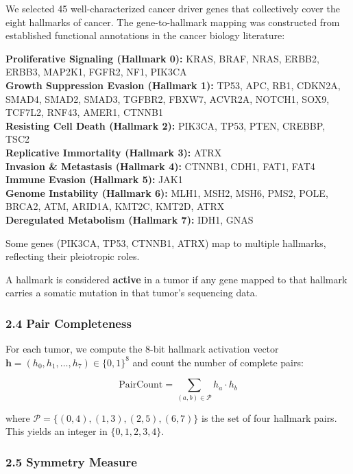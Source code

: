 \documentclass[
  11pt,
]{article}
\begin{document}
We selected 45 well-characterized cancer driver genes that collectively
cover the eight hallmarks of cancer. The gene-to-hallmark mapping was
constructed from established functional annotations in the cancer
biology literature:

\textbf{Proliferative Signaling (Hallmark 0):} KRAS, BRAF, NRAS, ERBB2,
ERBB3, MAP2K1, FGFR2, NF1, PIK3CA\\
\textbf{Growth Suppression Evasion (Hallmark 1):} TP53, APC, RB1,
CDKN2A, SMAD4, SMAD2, SMAD3, TGFBR2, FBXW7, ACVR2A, NOTCH1, SOX9,
TCF7L2, RNF43, AMER1, CTNNB1\\
\textbf{Resisting Cell Death (Hallmark 2):} PIK3CA, TP53, PTEN, CREBBP,
TSC2\\
\textbf{Replicative Immortality (Hallmark 3):} ATRX\\
\textbf{Invasion \& Metastasis (Hallmark 4):} CTNNB1, CDH1, FAT1, FAT4\\
\textbf{Immune Evasion (Hallmark 5):} JAK1\\
\textbf{Genome Instability (Hallmark 6):} MLH1, MSH2, MSH6, PMS2, POLE,
BRCA2, ATM, ARID1A, KMT2C, KMT2D, ATRX\\
\textbf{Deregulated Metabolism (Hallmark 7):} IDH1, GNAS

Some genes (PIK3CA, TP53, CTNNB1, ATRX) map to multiple hallmarks,
reflecting their pleiotropic roles.

A hallmark is considered \textbf{active} in a tumor if any gene mapped
to that hallmark carries a somatic mutation in that tumor's sequencing
data.

\subsubsection{2.4 Pair Completeness}\label{pair-completeness}

For each tumor, we compute the 8-bit hallmark activation vector
\(\mathbf{h} = (h_0, h_1, \ldots, h_7) \in \{0,1\}^8\) and count the
number of complete pairs:

\[\text{PairCount} = \sum_{(a,b) \in \mathcal{P}} h_a \cdot h_b \tag{1}\]

where \(\mathcal{P} = \{(0,4), (1,3), (2,5), (6,7)\}\) is the set of
four hallmark pairs. This yields an integer in \(\{0, 1, 2, 3, 4\}\).

\subsubsection{2.5 Symmetry Measure}\label{symmetry-measure}
\end{document}
